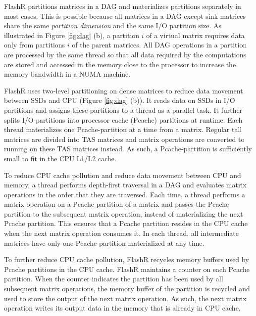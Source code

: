 FlashR partitions matrices in a DAG and materializes partitions separately in
most cases. This is possible because all matrices in a DAG except sink matrices
share the same \textit{partition dimension} and the same I/O partition size.
As illustrated in Figure \ref{fig:dag} (b), a partition $i$ of a virtual
matrix requires data only from partitions
$i$ of the parent matrices.  All DAG operations in a partition are processed by 
the same thread so that all data required by the computations are stored and
accessed in the memory close to the processor to increase the memory bandwidth
in a NUMA machine.

FlashR uses two-level partitioning on dense matrices to reduce data movement
between SSDs and CPU (Figure \ref{fig:dag} (b)). It reads data on SSDs in
I/O partitions and assigns these partitions to a thread as a parallel task.
It further splits I/O-partitions into processor cache (Pcache) partitions
at runtime.  Each thread materializes one Pcache-partition at a time from
a matrix. Regular tall matrices are divided into TAS matrices and matrix
operations are converted to running on these TAS matrices instead. As such,
a Pcache-partition is sufficiently small to fit in the CPU L1/L2 cache.

To reduce CPU cache pollution and reduce data movement between CPU and memory,
a thread performs depth-first traversal in a DAG and evaluates matrix operations
in the order that they are traversed. Each time, a thread performs a matrix
operation on a Pcache partition of a matrix and passes the Pcache partition to
the subsequent matrix operation, instead of materializing the next Pcache partition.
This ensures that a Pcache partition resides in the CPU cache when the next
matrix operation consumes it. In each thread, all intermediate matrices have
only one Pcache partition materialized at any time.

To further reduce CPU cache pollution, FlashR recycles memory buffers used
by Pcache partitions in the CPU cache. FlashR maintains a counter on each
Pcache partition. When the counter indicates the partition has been used
by all subsequent matrix operations, the memory buffer of the partition is
recycled and used to store the output of
the next matrix operation. As such, the next matrix operation writes
its output data in the memory that is already in CPU cache.
